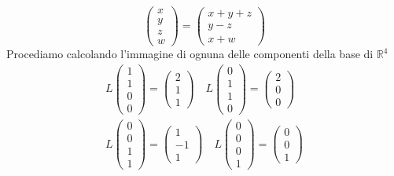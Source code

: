 \begin{example}
\begin{equation*}
\begin{pmatrix}
			x \\ y \\ z \\ w
		\end{pmatrix} = \begin{pmatrix}
			x + y + z \\
			y - z     \\
			x + w
		\end{pmatrix}
	\end{equation*}
	Procediamo calcolando l'immagine di ognuna delle componenti della base di
	$\mathbb{R}^4$
	\begin{gather*}
		L \begin{pmatrix}
			1 \\ 1 \\ 0 \\ 0
		\end{pmatrix} =
		\begin{pmatrix}
			2 \\ 1 \\ 1
		\end{pmatrix} \quad
		L \begin{pmatrix}
			0 \\ 1 \\ 1 \\ 0
		\end{pmatrix} =
		\begin{pmatrix}
			2 \\ 0 \\ 0
		\end{pmatrix} \\
		L \begin{pmatrix}
			0 \\ 0 \\ 1 \\ 1
		\end{pmatrix} =
		\begin{pmatrix}
			1 \\ -1 \\ 1
		\end{pmatrix} \quad
		L \begin{pmatrix}
			0 \\ 0 \\ 0 \\ 1
		\end{pmatrix} =
		\begin{pmatrix}
			0 \\ 0 \\ 1
		\end{pmatrix}
	\end{gather*}

\end{example}
